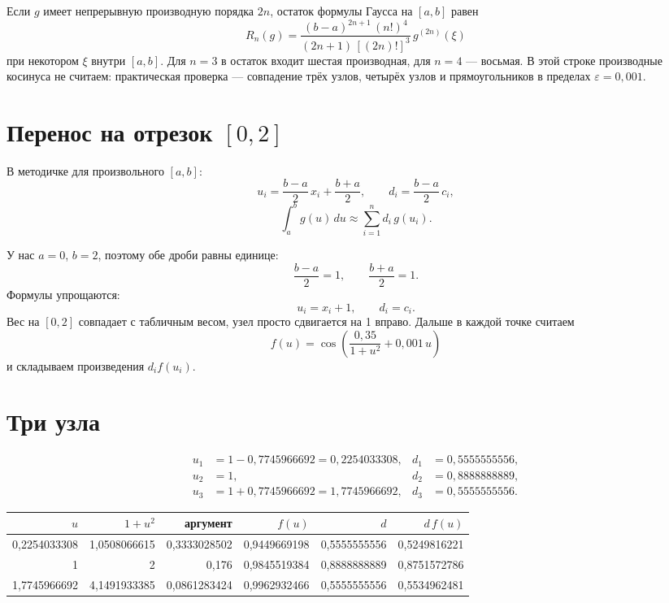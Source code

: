 \documentclass[11pt,a4paper]{article}
\begin{document}
Если \(g\) имеет непрерывную производную порядка \(2n\), остаток формулы Гаусса на \([a, b]\) равен
\[
R_{n}(g)
= \frac{(b - a)^{2n + 1}\,(n!)^{4}}{(2n + 1)\,[(2n)!]^{3}}\, g^{(2n)}(\xi)
\]
при некотором \(\xi\) внутри \([a, b]\).
Для \(n = 3\) в остаток входит шестая производная, для \(n = 4\) --- восьмая.
В этой строке производные косинуса не считаем: практическая проверка --- совпадение
трёх узлов, четырёх узлов и прямоугольников в пределах \(\varepsilon = 0{,}001\).

\section*{Перенос на отрезок \([0, 2]\)}

В методичке для произвольного \([a, b]\):
\[
u_{i} = \frac{b - a}{2}\, x_{i} + \frac{b + a}{2},
\qquad
d_{i} = \frac{b - a}{2}\, c_{i},
\]
\[
\int_{a}^{b} g(u)\, du \approx \sum_{i=1}^{n} d_{i}\, g(u_{i}).
\]

У нас \(a = 0\), \(b = 2\), поэтому обе дроби равны единице:
\[
\frac{b - a}{2} = 1,
\qquad
\frac{b + a}{2} = 1.
\]
Формулы упрощаются:
\[
u_{i} = x_{i} + 1,
\qquad
d_{i} = c_{i}.
\]
Вес на \([0, 2]\) совпадает с табличным весом, узел просто сдвигается на 1 вправо.
Дальше в каждой точке считаем
\[
f(u) = \cos\left(\frac{0{,}35}{1 + u^{2}} + 0{,}001\, u\right)
\]
и складываем произведения \(d_{i} f(u_{i})\).

\section*{Три узла}

\[
\begin{aligned}
u_{1} &= 1 - 0{,}7745966692 = 0{,}2254033308, & d_{1} &= 0{,}5555555556,\\
u_{2} &= 1, & d_{2} &= 0{,}8888888889,\\
u_{3} &= 1 + 0{,}7745966692 = 1{,}7745966692, & d_{3} &= 0{,}5555555556.
\end{aligned}
\]

{\small
\begin{center}
\begin{tabular}{@{}r r r r r r@{}}
\toprule
\(u\) & \(1+u^{2}\) & аргумент & \(f(u)\) & \(d\) & \(d\,f(u)\) \\
\midrule
0,2254033308 & 1,0508066615 & 0,3333028502 & 0,9449669198 & 0,5555555556 & 0,5249816221 \\
1 & 2 & 0,176 & 0,9845519384 & 0,8888888889 & 0,8751572786 \\
1,7745966692 & 4,1491933385 & 0,0861283424 & 0,9962932466 & 0,5555555556 & 0,5534962481 \\
\bottomrule
\end{tabular}
\end{center}
}
\end{document}
